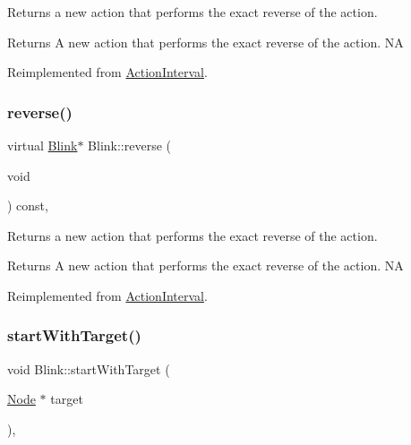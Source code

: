 Returns a new action that performs the exact reverse of the action.

\begin{DoxyReturn}{Returns}
A new action that performs the exact reverse of the action.  NA 
\end{DoxyReturn}


Reimplemented from \hyperlink{classActionInterval_a9f9ac7164036a0bc261a72f62a2b2da7}{Action\+Interval}.

\mbox{\label{classBlink_aa491375c4dd70b209c4602a58b6e6e95}} 
\subsubsection{\texorpdfstring{reverse()}{reverse()}\hspace{0.1cm}{\footnotesize\ttfamily [2/2]}}
{\footnotesize\ttfamily virtual \hyperlink{classBlink}{Blink}$\ast$ Blink\+::reverse (\begin{DoxyParamCaption}\item[{void}]{ }\end{DoxyParamCaption}) const\hspace{0.3cm}{\ttfamily [override]}, {\ttfamily [virtual]}}

Returns a new action that performs the exact reverse of the action.

\begin{DoxyReturn}{Returns}
A new action that performs the exact reverse of the action.  NA 
\end{DoxyReturn}


Reimplemented from \hyperlink{classActionInterval_a9f9ac7164036a0bc261a72f62a2b2da7}{Action\+Interval}.

\mbox{\label{classBlink_a29dde0a5d1edba675cd5a9e60cfa2de7}} 
\subsubsection{\texorpdfstring{start\+With\+Target()}{startWithTarget()}\hspace{0.1cm}{\footnotesize\ttfamily [1/2]}}
{\footnotesize\ttfamily void Blink\+::start\+With\+Target (\begin{DoxyParamCaption}\item[{\hyperlink{classNode}{Node} $\ast$}]{target }\end{DoxyParamCaption})\hspace{0.3cm}{\ttfamily [override]}, {\ttfamily [virtual]}}

